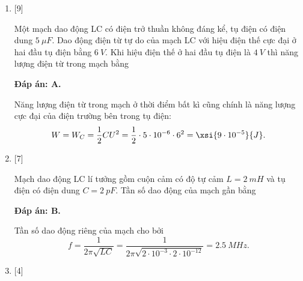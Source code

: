 \begin{enumerate}[label=\bfseries Câu \arabic*:]
{	}

	\item {} [9]
	
	\cauhoi
	{Một mạch dao động LC có điện trở thuần không đáng kể, tụ điện có điện dung $\SI{5}{\mu F}$. Dao động điện từ tự do của mạch LC với hiệu điện thế cực đại ở hai đầu tụ điện bằng $\SI{6}{V}$. Khi hiệu điện thế ở hai đầu tụ điện là $\SI{4}{V}$ thì năng lượng điện từ trong mạch bằng
	}
	
	\loigiai
	{		\textbf{Đáp án: A.}
		
		Năng lượng điện từ trong mạch ở thời điểm bất kì cũng chính là năng lượng cực đại của điện trường bên trong tụ điện:
		$$
		W = W_C = \dfrac{1}{2}CU^{2} = \dfrac{1}{2} \cdot 5\cdot10^{-6} \cdot 6^{2} = \xsi{9\cdot10^{-5}}{J}.
		$$
	}

	\item {} [7]
	
	\cauhoi
	{Mạch dao động LC lí tưởng gồm cuộn cảm có độ tự cảm $L = \SI{2}{mH}$ và tụ điện có điện dung $C = \SI{2}{pF}$. Tần số dao động của mạch gần bằng
	}
	
	\loigiai
	{		\textbf{Đáp án: B.}
		
		Tần số dao động riêng của mạch cho bởi
		$$
		f = \dfrac{1}{2\pi \sqrt{LC}} = \dfrac{1}{2\pi \sqrt{2\cdot 10^{-3} \cdot 2\cdot 10^{-12}}} = \SI{2,5}{MHz}.
		$$
		
	}


	\item {} [4]
	

\end{enumerate}
